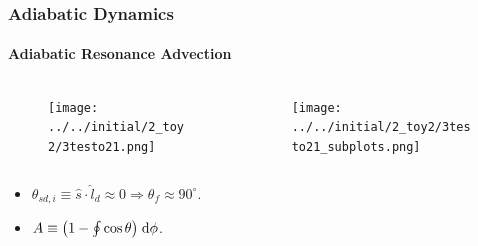 \documentclass[dvipsnames]{beamer}
\DeclarePairedDelimiter\p{\lparen}{\rparen}
\begin{document}
\begin{frame}
    \frametitle{Adiabatic Dynamics}
    \framesubtitle{Adiabatic Resonance Advection}

    \begin{columns}
        \begin{column}{0.5\textwidth}
            \begin{figure}[t]
                \centering
                \texttt{[image: ../../initial/2\_toy2/3testo21.png]}
            \end{figure}
        \end{column}
        \begin{column}{0.5\textwidth}
            \begin{figure}[t]
                \centering
                \texttt{[image: ../../initial/2\_toy2/3testo21\_subplots.png]}
            \end{figure}
        \end{column}
    \end{columns}
    \begin{itemize}
        \item $\theta_{sd, i} \equiv \hat{s} \cdot \hat{l}_d \approx 0
              \Rightarrow \theta_f \approx 90^\circ$.

        \item $A \equiv \p*{1 - \oint \cos\theta} \;\mathrm{d}\phi$.
    \end{itemize}
\end{frame}
\end{document}
